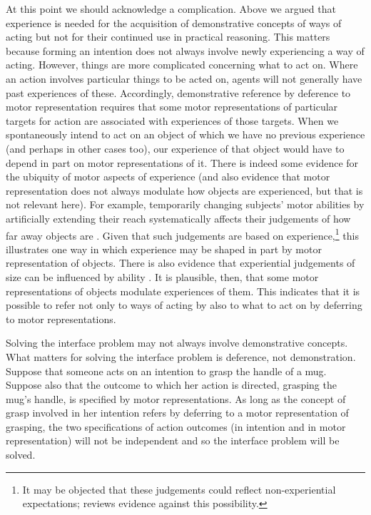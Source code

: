 \documentclass[12pt,\papersize]{extarticle}
\begin{document}
At this point we should acknowledge a complication.  Above we argued that experience is needed for the acquisition of demonstrative concepts of ways of acting but not for their continued use in practical reasoning.  This matters because forming an intention does not always involve newly experiencing a way of acting. However, things are more complicated concerning what to act on. Where an action involves particular things to be acted on, agents will not generally have past experiences of these.  Accordingly, demonstrative reference by deference to motor representation requires that some motor representations of particular targets for action are associated with experiences of those targets.  When we spontaneously intend to act on an object of which we have no previous experience (and perhaps in other cases too), our experience of that object would have to depend in part on motor representations of it.  There is indeed some evidence for the ubiquity of motor aspects of experience (and also evidence that motor representation does not always modulate how objects are experienced, but that is not relevant here).  For example, temporarily changing subjects' motor abilities by artificially extending their reach systematically affects their judgements of how far away objects are \citep{linkenauger:2009_effects, costantini2011tool}. Given that such judgements are based on experience,\footnote{
It may be objected that these judgements could reflect non-experiential expectations; \citet[pp.\ 203-4]{witt:2011_action} reviews evidence against this possibility.
} 
this illustrates one way in which experience may be shaped in part by motor representation of objects.  
There is also evidence that experiential judgements of size can be influenced by ability \citep[e.g.][]{witt2009kicking}.  
It is plausible, then, that some motor representations of objects  modulate experiences of them.  
This indicates that it is possible to refer not only to ways of acting by also to what to act on by deferring to motor representations.

Solving the interface problem may not always involve demonstrative concepts. What matters for solving the interface problem is deference, not demonstration. Suppose that someone acts on an intention to grasp the handle of a mug.  Suppose also that the outcome to which her action is directed, grasping the mug's handle, is specified by motor representations. As long as the concept of grasp involved in her intention refers by deferring to a motor representation of grasping, the two specifications of action outcomes (in intention and in motor representation) will not be independent and so the interface problem will be solved.
\end{document}
